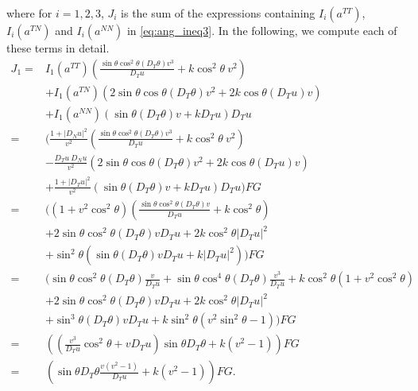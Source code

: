 \documentclass[12pt]{article}
\numberwithin{equation}{section}
\theoremstyle{plain}
\theoremstyle{definition}
\theoremstyle{remark}
\begin{document}
where for $i=1,2,3$, $J_i$ is the sum of the expressions containing 
$I_i(a^{TT})$, $I_i(a^{TN})$ and $I_i(a^{NN})$ in \eqref{eq:ang_ineq3}. In the following,
we compute each of these terms in detail. 
\begin{equation} \label{eq:ang_J1}
    \begin{split} 
        J_1 = & I_1(a^{TT})\left(\frac{ \sin{\theta} \cos^2\theta (D_T \theta) v^3 }{D_T u} + k \cos^2\theta \ v^2\right) \\
        & + I_1(a^{TN}) \left(2\sin{\theta} \cos{\theta} (D_T \theta) v^2 + 2k \cos{\theta} (D_T u) v \right) \\
        & + I_1(a^{NN}) \left(\sin{\theta} (D_T \theta) v + k D_T u \right) D_T u  \\
        = & \Bigg( \frac{1+|D_N u|^2}{v^2} \left(\frac{ \sin{\theta} \cos^2\theta (D_T \theta) v^3 }{D_T u} + k \cos^2\theta \ v^2 \right)  \\
        & - \frac{D_T u \ D_N u}{v^2} \left(2\sin{\theta} \cos{\theta} (D_T \theta) v^2 + 2k \cos{\theta} (D_T u) v \right) \\
        &  + \frac{1+|D_T u|^2}{v^2} \left(\sin{\theta} (D_T \theta) v + k D_T u\right) D_T u  \Bigg)  F G \\
        = & \Bigg( (1+v^2 \cos^2 \theta) \left(\frac{ \sin{\theta} \cos^2\theta (D_T \theta) v }{D_T u} + k \cos^2\theta \right) \\
        & + 2 \sin{\theta} \cos^2 \theta (D_T \theta) v D_T u + 2k \cos^2 \theta |D_T u|^2 \\ 
        &  +  \sin^2 \theta \left(\sin{\theta} (D_T \theta) v D_T u + k |D_T u|^2 \right)  \Bigg) F G \\
        = & \Bigg( \sin{\theta} \cos^2 \theta (D_T \theta) \frac{v}{D_T u} + \sin{\theta} \cos^4 \theta (D_T \theta) \frac{v^3}{D_T u} +k \cos^2 \theta (1+ v^2 \cos^2 \theta) \\
        & + 2 \sin{\theta} \cos^2 \theta (D_T \theta) v D_T u  + 2 k \cos^2 \theta |D_T u|^2 \\
        & + \sin^3 \theta (D_T \theta) v D_T u + k \sin^2 \theta (v^2 \sin^2 \theta - 1)  \Bigg ) F G \\
        = & \left(  \left( \frac{v^3}{D_T u} \cos^2 \theta + v D_T u \right) \sin{\theta} D_T \theta  + k(v^2-1)      \right) F G  \\
        = & \left( \sin{\theta} D_T \theta  \frac{v(v^2-1)}{D_T u} + k(v^2-1)  \right) 
        F G.
    \end{split}
\end{equation}
\end{document}
